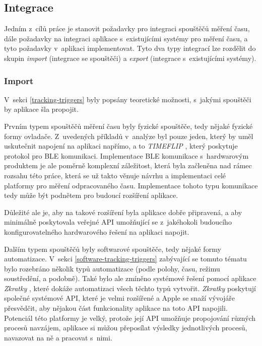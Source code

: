 \subsection{Integrace}\label{feature-integration}

Jedním z~cílů práce je stanovit požadavky pro integraci spouštěčů měření času, dále požadavky na integraci aplikace s~existujícími systémy pro měření času, a tyto požadavky v~aplikaci implementovat. Tyto dva typy integrací lze rozdělit do skupin \emph{import} (integrace se spouštěči) a \emph{export} (integrace s~existujícími systémy).

\subsubsection{Import}\label{feature-integration-import}

V~sekci \ref{tracking-triggers} byly popsány teoretické možnosti, s~jakými spouštěči by aplikace šla propojit.

Prvním typem spouštěčů měření času byly fyzické spouštěče, tedy nějaké fyzické formy ovladače. Z~uvedených příkladů v~analýze byl pouze jeden, který by uměl uskutečnit napojení na aplikaci napřímo, a to \emph{TIMEFLIP} \cite{timeflip}, který poskytuje protokol pro BLE komunikaci. Implementace BLE komunikace s~hardwarovým produktem je ale poměrně komplexní záležitost, která byla začleněna nad rámec rozsahu této práce, která se už takto věnuje návrhu a implementaci celé platformy pro měření odpracovaného času. Implementace tohoto typu komunikace tedy může být podnětem pro budoucí rozšíření aplikace.

Důležité ale je, aby na takové rozšíření byla aplikace dobře připravená, a aby minimálně poskytovala veřejné API umožňující se z~jakéhokoli budoucího konfigurovatelného hardwarového řešení na aplikaci napojit.

Dalším typem spouštěčů byly softwarové spouštěče, tedy nějaké formy automatizace. V~sekci \ref{software-tracking-triggers} zabývající se tomuto tématu bylo rozebráno několik typů automatizace (podle polohy, času, režimu soustředění, a podobně). Také bylo ale zmíněno systémové řešení pomocí aplikace \emph{Zkratky} \cite{ios-shortcuts-app}, které dokáže automatizaci všech těchto typů vytvořit. \emph{Zkratky} poskytují společné systémové API, které je velmi rozšířené a Apple se snaží vývojáře přesvědčit, aby nějakou část funkcionality aplikace na toto API napojili. Potenciál této platformy je velký, protože její API umožňuje propojování různých procesů navzájem, aplikace si můžou přeposílat výsledky jednotlivých procesů, navazovat na ně a pracovat s~nimi. 

